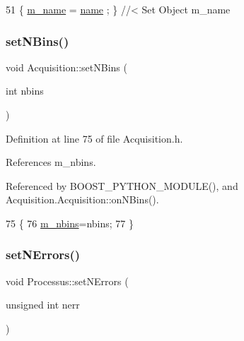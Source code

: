 \begin{DoxyCode}
51 \{ \hyperlink{classObject_a8b83c95c705d2c3ba0d081fe1710f48d}{m\_name}  = \hyperlink{classObject_a300f4c05dd468c7bb8b3c968868443c1}{name}  ; \} \textcolor{comment}{//< Set Object m\_name}
\end{DoxyCode}
\mbox{\label{classAcquisition_a6ee040a009aa48f848b1e12434135db9}} 
\subsubsection{\texorpdfstring{set\+N\+Bins()}{setNBins()}}
{\footnotesize\ttfamily void Acquisition\+::set\+N\+Bins (\begin{DoxyParamCaption}\item[{int}]{nbins }\end{DoxyParamCaption})\hspace{0.3cm}{\ttfamily [inline]}}



Definition at line 75 of file Acquisition.\+h.



References m\+\_\+nbins.



Referenced by B\+O\+O\+S\+T\+\_\+\+P\+Y\+T\+H\+O\+N\+\_\+\+M\+O\+D\+U\+L\+E(), and Acquisition.\+Acquisition\+::on\+N\+Bins().


\begin{DoxyCode}
75                           \{
76     \hyperlink{classAcquisition_a05bccdc4b9ada37beaeba8794ccef12d}{m\_nbins}=nbins;
77   \}
\end{DoxyCode}
\mbox{\label{classProcessus_a831b027b9cf18ab56fa6147b5d3055da}} 
\subsubsection{\texorpdfstring{set\+N\+Errors()}{setNErrors()}}
{\footnotesize\ttfamily void Processus\+::set\+N\+Errors (\begin{DoxyParamCaption}\item[{unsigned int}]{nerr }\end{DoxyParamCaption})\hspace{0.3cm}{\ttfamily [inherited]}}

